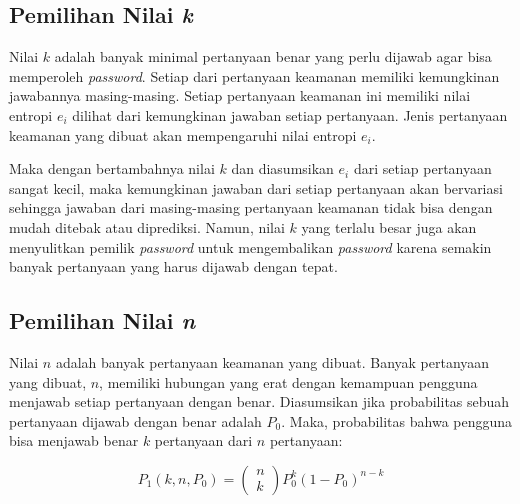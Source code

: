\subsection{Pemilihan Nilai \textit{k}}

Nilai \begin{math}k\end{math} adalah banyak minimal pertanyaan benar yang perlu dijawab agar bisa memperoleh \textit{password}. Setiap dari pertanyaan keamanan memiliki kemungkinan jawabannya masing-masing. Setiap pertanyaan keamanan ini memiliki nilai entropi \begin{math}e_i\end{math} dilihat dari kemungkinan jawaban setiap pertanyaan. Jenis pertanyaan keamanan yang dibuat akan mempengaruhi nilai entropi $e_i$.

Maka dengan bertambahnya nilai \begin{math}k\end{math} dan diasumsikan \begin{math}e_i\end{math} dari setiap pertanyaan sangat kecil, maka kemungkinan jawaban dari setiap pertanyaan akan bervariasi sehingga jawaban dari masing-masing pertanyaan keamanan tidak bisa dengan mudah ditebak atau diprediksi. Namun, nilai \begin{math}k\end{math} yang terlalu besar juga akan menyulitkan pemilik \textit{password} untuk mengembalikan \textit{password} karena semakin banyak pertanyaan yang harus dijawab dengan tepat.

\subsection{Pemilihan Nilai \textit{n}}

Nilai \begin{math}n\end{math} adalah banyak pertanyaan keamanan yang dibuat. Banyak pertanyaan yang dibuat, $n$, memiliki hubungan yang erat dengan kemampuan pengguna menjawab setiap pertanyaan dengan benar. Diasumsikan jika probabilitas sebuah pertanyaan dijawab dengan benar adalah $P_0$. Maka, probabilitas bahwa pengguna bisa menjawab benar $k$ pertanyaan dari $n$ pertanyaan\cite{ellison2000protecting}:

\begin{equation}
	P_1(k,n,P_0) = \left(\begin{array}{c}n\\k\end{array}\right) P_0^k (1-P_0)^{n-k}
	\label{eq:pilihn1}
\end{equation}

